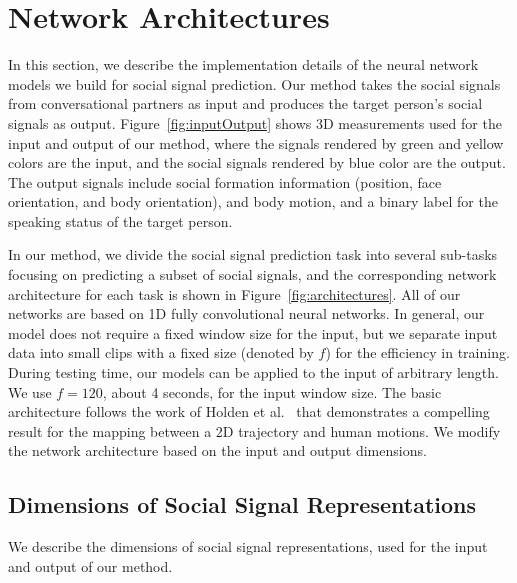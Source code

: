 
\section{Network Architectures}

In this section, we describe the implementation details of the neural network models we build for social signal prediction. Our method takes the social signals from conversational partners as input and produces the target person's social signals as output. Figure~\ref{fig:inputOutput} shows 3D measurements used for the input and output of our method, where the signals rendered by green and yellow colors are the input, and the social signals rendered by blue color are the output. The output signals include social formation information (position, face orientation, and body orientation), and body motion, and a binary label for the speaking status of the target person. 

In our method, we divide the social signal prediction task into several sub-tasks focusing on predicting a subset of social signals, and the corresponding network architecture for each task is shown in Figure~\ref{fig:architectures}. All of our networks are based on 1D fully convolutional neural networks. In general, our model does not require a fixed window size for the input, but we separate input data into small clips with a fixed size (denoted by $f$) for the efficiency in training. During testing time, our models can be applied to the input of arbitrary length. We use $f=120$, about 4 seconds, for the input window size. The basic architecture follows the work of Holden et al.~\cite{holden2016deep} that demonstrates a compelling result for the mapping between a 2D trajectory and human motions. We modify the network architecture based on the input and output dimensions. 

\subsection{Dimensions of Social Signal Representations}
We describe the dimensions of social signal representations, used for the input and output of our method.


